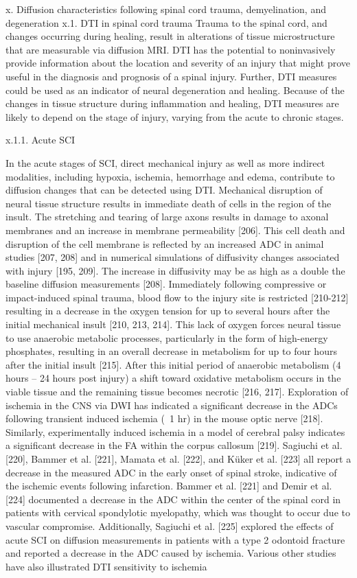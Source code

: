 x. Diffusion characteristics following spinal cord trauma, demyelination, and degeneration
x.1. DTI in spinal cord trauma
Trauma to the spinal cord, and changes occurring during healing, result in alterations of tissue microstructure that are measurable via diffusion MRI. DTI has the potential to noninvasively provide information about the location and severity of an injury that might prove useful in the diagnosis and prognosis of a spinal injury.  Further, DTI measures could be used as an indicator of neural degeneration and healing.  Because of the changes in tissue structure during inflammation and healing, DTI measures are likely to depend on the stage of injury, varying from the acute to chronic stages.  

x.1.1. Acute SCI

In the acute stages of SCI, direct mechanical injury as well as more indirect modalities, including hypoxia, ischemia, hemorrhage and edema, contribute to diffusion changes that can be detected using DTI. Mechanical disruption of neural tissue structure results in immediate death of cells in the region of the insult.  The stretching and tearing of large axons results in damage to axonal membranes and an increase in membrane permeability [206].  This cell death and disruption of the cell membrane is reflected by an increased ADC in animal studies [207, 208] and in numerical simulations of diffusivity changes associated with injury [195, 209].  The increase in diffusivity may be as high as a double the baseline diffusion measurements [208]. Immediately following compressive or impact-induced spinal trauma, blood flow to the injury site is restricted [210-212] resulting in a decrease in the oxygen tension for up to several hours after the initial mechanical insult [210, 213, 214].  This lack of oxygen forces neural tissue to use anaerobic metabolic processes, particularly in the form of high-energy phosphates, resulting in an overall decrease in metabolism for up to four hours after the initial insult [215].  After this initial period of anaerobic metabolism (4 hours – 24 hours post injury) a shift toward oxidative metabolism occurs in the viable tissue and the remaining tissue becomes necrotic [216, 217].  Exploration of ischemia in the CNS via DWI has indicated a significant decrease in the ADCs following transient induced ischemia (~1 hr) in the mouse optic nerve [218].  Similarly, experimentally induced ischemia in a model of cerebral palsy indicates a significant decrease in the FA within the corpus callosum [219].  Sagiuchi et al. [220], Bammer et al. [221], Mamata et al. [222], and Küker et al. [223] all report a decrease in the measured ADC in the early onset of spinal stroke, indicative of the ischemic events following infarction.  Bammer et al. [221] and Demir et al. [224] documented a decrease in the ADC within the center of the spinal cord in patients with cervical spondylotic myelopathy, which was thought to occur due to vascular compromise.  Additionally, Sagiuchi et al. [225] explored the effects of acute SCI on diffusion measurements in patients with a type 2 odontoid fracture and reported a decrease in the ADC caused by ischemia.  Various other studies have also illustrated DTI sensitivity to ischemia 